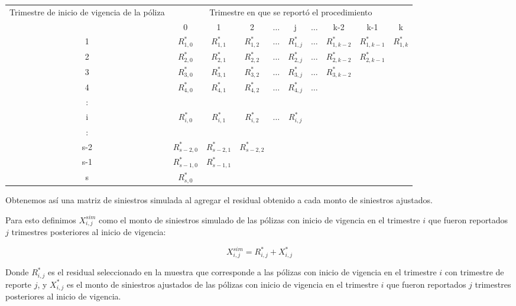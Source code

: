 \documentclass[11pt,twoside,openright,spanish]{report}
\numberwithin{equation}{chapter}
\numberwithin{figure}{chapter}
\numberwithin{table}{chapter}
\begin{document}
	\begin{table}[H]
		\centering
		\begin{tabularx}{\linewidth}{ c |ccccccccc}
			\multirow{2}{4cm}{Trimestre de inicio de vigencia de la póliza}& \multicolumn{9}{c}{Trimestre en que se reportó el procedimiento} \\
			& 0  & 1 & 2 & $ \dots $ & j & $\dots $ & k-2 & k-1 &  k\\
			\midrule
			1      &  $R_{1,0}^{*}$ & $R_{1,1}^{*}$ & $R_{1,2}^{*}$ & $ \dots $ & $R_{1,j}^{*}$ & $ \dots $ & $R_{1,k-2}^{*}$ & $R_{1,k-1}^{*}$ & $R_{1,k}^{*}$ \\
			2      &  $R_{2,0}^{*}$ & $R_{2,1}^{*}$ & $R_{2,2}^{*}$ & $ \dots $ & $R_{2,j}^{*}$ & $ \dots $ & $R_{2,k-2}^{*}$ & $R_{2,k-1}^{*}$ & \\
			3      &  $R_{3,0}^{*}$ & $R_{3,1}^{*}$ & $R_{3,2}^{*}$ & $ \dots $ & $R_{3,j}^{*}$ & $ \dots $ & $R_{3,k-2}^{*}$ & & \\
			4      &  $R_{4,0}^{*}$ & $R_{4,1}^{*}$ & $R_{4,2}^{*}$ & $ \dots $ & $R_{4,j}^{*}$ & $ \dots $ & & & \\
			:      & & & & & & & & & \\
			i      &  $R_{i,0}^{*}$ & $R_{i,1}^{*}$ & $R_{i,2}^{*}$ & $ \dots $ & $R_{i,j}^{*}$ & & & & \\
			:      & & & & & & & & & \\
			s-2      &  $R_{s-2,0}^{*}$ & $R_{s-2,1}^{*}$ & $R_{s-2,2}^{*}$ & & & & & & \\
			s-1      &  $R_{s-1,0}^{*}$ & $R_{s-1,1}^{*}$ & & & & & & & \\
			s      &  $R_{s,0}^{*}$ & & & & & & & & \\
		\end{tabularx}
	\end{table}

	Obtenemos así una matriz de siniestros simulada al agregar el residual obtenido a cada monto de siniestros ajustados.
	
	Para esto definimos $X_{i,j}^{sim}$ como el monto de siniestros simulado de las pólizas con inicio de vigencia en el trimestre $i$ que fueron reportados $j$ trimestres posteriores al inicio de vigencia:
	
	$$X_{i,j}^{sim}=R_{i,j}^{*}+X_{i,j}^{*}$$ 
	
	Donde $R_{i,j}^{*}$ es el residual seleccionado en la muestra que corresponde a las pólizas con inicio de vigencia en el trimestre $i$ con trimestre de reporte $j$, y $X_{i,j}^{*}$ es el monto de siniestros ajustados de las pólizas con inicio de vigencia en el trimestre $i$ que fueron reportados $j$ trimestres posteriores al inicio de vigencia.
	
\end{document}

